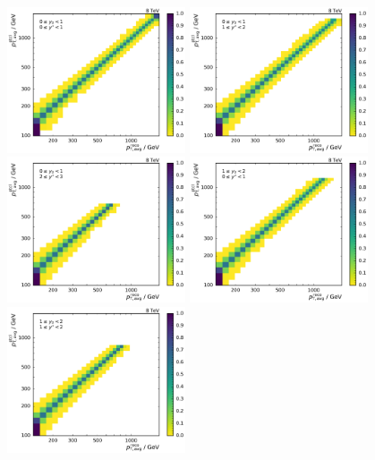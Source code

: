 \begin{figure}[htp]
    \centering
    \includegraphics[width=0.47\textwidth]{figures/measurement/res_matrix_ptavg_normalized_yb0ys0.pdf}\hfill
    \includegraphics[width=0.47\textwidth]{figures/measurement/res_matrix_ptavg_normalized_yb0ys1.pdf}
    \includegraphics[width=0.47\textwidth]{figures/measurement/res_matrix_ptavg_normalized_yb0ys2.pdf}\hfill
    \includegraphics[width=0.47\textwidth]{figures/measurement/res_matrix_ptavg_normalized_yb1ys0.pdf}
    \includegraphics[width=0.47\textwidth]{figures/measurement/res_matrix_ptavg_normalized_yb1ys1.pdf}\hfill

\end{figure}
